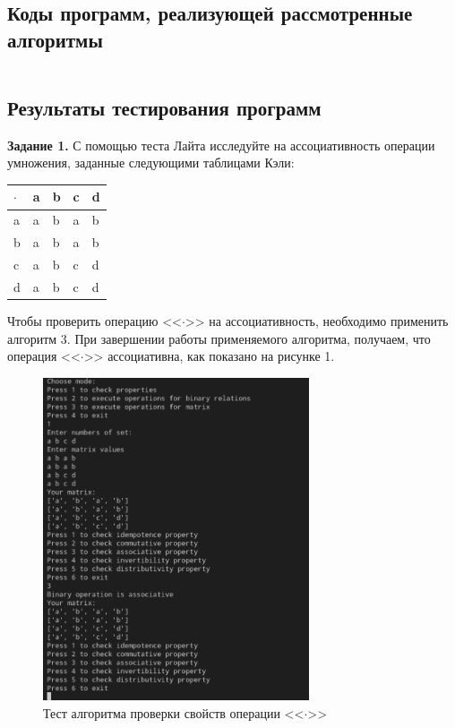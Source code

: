 \documentclass[bachelor, och, labwork]{shiza}
\begin{document}
        \subsection{Коды программ, реализующей рассмотренные алгоритмы}


        \inputminted[fontsize=\small]{Python}{code/aua-lab3.py}








    \subsection{Результаты тестирования программ}
        \textbf{Задание 1.} С помощью теста Лайта исследуйте на ассоциативность операции умножения, заданные следующими таблицами Кэли:

        \begin{table}[H]
            \centering
            \begin{tabular}{|l|l|l|l|l|}
            \hline
            $\cdot$ & a & b & c & d \\ \hline
            a & a & b & a & b \\ \hline
            b & a & b & a & b \\ \hline
            c & a & b & c & d \\ \hline
            d & a & b & c & d \\ \hline
        \end{tabular}
        \end{table}

        Чтобы проверить операцию <<$\cdot$>> на ассоциативность, необходимо применить алгоритм 3. При завершении работы применяемого алгоритма,
        получаем, что операция <<$\cdot$>> ассоциативна, как показано на рисунке 1.

        \begin{figure}[H]
            \centering
            \includegraphics[width=0.7\textwidth]{photo/1.png}
            \caption{Тест алгоритма проверки свойств операции <<$\cdot$>>}
        \end{figure}
\end{document}
